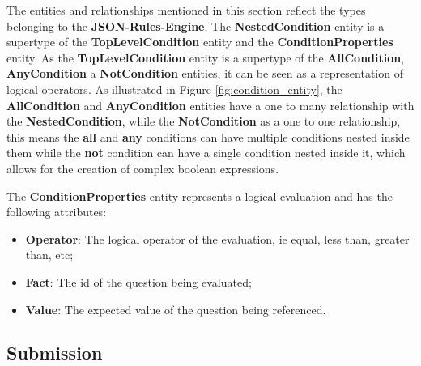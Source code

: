 The entities and relationships mentioned in this section reflect the types belonging to the \textbf{JSON-Rules-Engine}.
The  \textbf{NestedCondition} entity is a supertype of the \textbf{TopLevelCondition} entity and the \textbf{ConditionProperties} entity.
As the \textbf{TopLevelCondition} entity is a supertype of the \textbf{AllCondition}, \textbf{AnyCondition} a \textbf{NotCondition} entities, it can be seen as a representation of logical operators. As illustrated in Figure \ref{fig:condition_entity}, the \textbf{AllCondition} and \textbf{AnyCondition} entities have a one to many relationship with the \textbf{NestedCondition}, while the \textbf{NotCondition} as a one to one relationship, this means the \textbf{all} and \textbf{any} conditions can have multiple conditions nested inside them while the \textbf{not} condition can have a single condition nested inside it, which allows for the creation of complex boolean expressions.

The \textbf{ConditionProperties} entity represents a logical evaluation and has the following attributes:
\begin{itemize}
	\item \textbf{Operator}: The logical operator of the evaluation, ie equal, less than, greater than, etc;
	\item \textbf{Fact}: The id of the question being evaluated;
	\item \textbf{Value}: The expected value of the question being referenced.
\end{itemize}





\subsection{Submission}\label{sec:submission}

